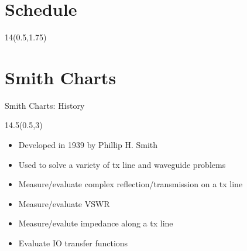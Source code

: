 
\section{Schedule}
\renewcommand{\arraystretch}{1}
\begin{frame}{}
	\begin{textblock}{14}(0.5,1.75)
	\def\myfontsize{footnotesize}
	
	\end{textblock}
\end{frame}




\section{Smith Charts}
\begin{frame}{Smith Charts: History}
	\begin{textblock}{14.5}(0.5,3)

	\begin{itemize}
		\setlength\itemsep{18pt}
		\item Developed in 1939 by Phillip H. Smith
		\item Used to solve a variety of tx line and waveguide problems
		\item  Measure/evaluate complex reflection/transmission on a tx line
		\item Measure/evaluate VSWR
		\item Measure/evalute impedance along a tx line
		\item Evaluate IO transfer functions
	\end{itemize}
	
	\end{textblock}
	
\end{frame}

